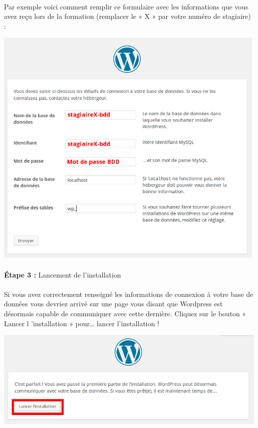 \documentclass[10pt,a4paper]{article}
\begin{document}
\paragraph{}Par exemple voici comment remplir ce formulaire avec les informations que vous avez reçu lors de la formation (remplacer le « X » par votre numéro de stagiaire) :
\begin{center}
\includegraphics[scale=0.5]{img/0041.png}
\end{center}
\paragraph{}\textbf{Étape 3 : }Lancement de l'installation
\paragraph{}Si vous avez correctement renseigné les informations de connexion à votre base de données vous devriez arrivé sur une page vous disant que Wordpress est désormais capable de communiquer avec cette dernière. Cliquez sur le bouton « Lancer l 'installation » pour… lancer l'installation !
\begin{center}
\includegraphics[scale=0.5]{img/0042.png}
\end{center}
\end{document}
